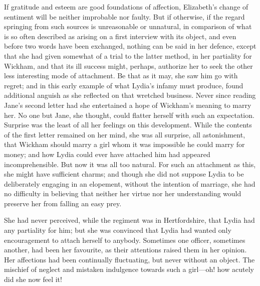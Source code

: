 \documentclass[10pt]{book}
\begin{document}
   If gratitude and esteem are good foundations of affection, Elizabeth’s
change of sentiment will be neither improbable nor faulty. But if
otherwise, if the regard springing from such sources is unreasonable or
unnatural, in comparison of what is so often described as arising on a
first interview with its object, and even before two words have been
exchanged, nothing can be said in her defence, except that she had given
somewhat of a trial to the latter method, in her partiality for Wickham,
and that its ill success might, perhaps, authorize her to seek the other
less interesting mode of attachment. Be that as it may, she saw him go
with regret; and in this early example of what Lydia’s infamy must
produce, found additional anguish as she reflected on that wretched
business. Never since reading Jane’s second letter had she entertained a
hope of Wickham’s meaning to marry her. No one but Jane, she thought,
could flatter herself with such an expectation. Surprise was the least
of all her feelings on this development. While the contents of the first
letter remained on her mind, she was all surprise,
   all astonishment,
that Wickham should marry a girl whom it was impossible he could marry
for money; and how Lydia could ever have attached him had appeared
incomprehensible. But now it was all too natural. For such an attachment
as this, she might have sufficient charms; and though she did not
suppose Lydia to be deliberately engaging in an elopement, without the
intention of marriage, she had no difficulty in believing that neither
her virtue nor her understanding would preserve her from falling an easy
prey.
  

   She had never perceived, while the regiment was in Hertfordshire, that
Lydia had any partiality for him; but she was convinced that Lydia had
wanted only encouragement to attach herself to anybody. Sometimes one
officer, sometimes another, had been her favourite, as their attentions
raised them in her opinion. Her affections had been continually
fluctuating, but never without an object. The mischief of neglect and
mistaken indulgence towards such a girl—oh! how acutely did she now
feel it!
  
\end{document}
